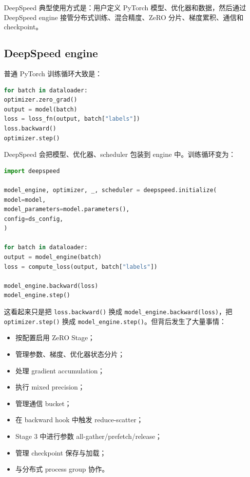 DeepSpeed 典型使用方式是：用户定义 PyTorch 模型、优化器和数据，然后通过 DeepSpeed engine 接管分布式训练、混合精度、ZeRO 分片、梯度累积、通信和 checkpoint。

\subsection{DeepSpeed engine}
\label{subsec:deepspeed-engine}

普通 PyTorch 训练循环大致是：

\begin{lstlisting}[language=Python,caption={普通 PyTorch 训练循环的抽象形式},label={lst:normal-pytorch-loop}]
for batch in dataloader:
optimizer.zero_grad()
output = model(batch)
loss = loss_fn(output, batch["labels"])
loss.backward()
optimizer.step()
\end{lstlisting}

DeepSpeed 会把模型、优化器、scheduler 包装到 engine 中。训练循环变为：

\begin{lstlisting}[language=Python,caption={DeepSpeed engine 训练循环的抽象形式},label={lst:deepspeed-engine-loop}]
import deepspeed

model_engine, optimizer, _, scheduler = deepspeed.initialize(
model=model,
model_parameters=model.parameters(),
config=ds_config,
)

for batch in dataloader:
output = model_engine(batch)
loss = compute_loss(output, batch["labels"])

model_engine.backward(loss)
model_engine.step()

\end{lstlisting}

这看起来只是把 \texttt{loss.backward()} 换成 \texttt{model_engine.backward(loss)}，把 \texttt{optimizer.step()} 换成 \texttt{model_engine.step()}。但背后发生了大量事情：

\begin{itemize}
\item 按配置启用 ZeRO Stage；
\item 管理参数、梯度、优化器状态分片；
\item 处理 gradient accumulation；
\item 执行 mixed precision；
\item 管理通信 bucket；
\item 在 backward hook 中触发 reduce-scatter；
\item Stage 3 中进行参数 all-gather/prefetch/release；
\item 管理 checkpoint 保存与加载；
\item 与分布式 process group 协作。
\end{itemize}

